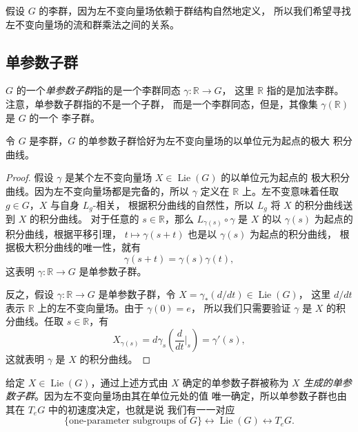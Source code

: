 \documentclass[fontset=none]{Notes}
\DeclareMathOperator\Lie{Lie}
\begin{document}
假设 $G$ 的李群，因为左不变向量场依赖于群结构自然地定义，
所以我们希望寻找左不变向量场的流和群乘法之间的关系。

\subsection{单参数子群}

$G$ 的一个\emph{单参数子群}指的是一个李群同态 $\gamma:\mathbb{R}\to G$，
这里 $\mathbb{R}$ 指的是加法李群。注意，单参数子群指的不是一个子群，
而是一个李群同态，但是，其像集 $\gamma(\mathbb{R})$ 是 $G$ 的一个
李子群。

\begin{theorem}[单参数子群的特征]
  令 $G$ 是李群，$G$ 的单参数子群恰好为左不变向量场的以单位元为起点的极大
  积分曲线。
\end{theorem}
\begin{proof}
  假设 $\gamma$ 是某个左不变向量场 $X\in\Lie(G)$ 的以单位元为起点的
  极大积分曲线。因为左不变向量场都是完备的，所以 $\gamma$ 
  定义在 $\mathbb{R}$ 上。左不变意味着任取 $g\in G$，$X$ 与自身 $L_g$-相关，
  根据积分曲线的自然性，所以 $L_g$ 将 $X$ 的积分曲线送到 $X$ 的积分曲线。
  对于任意的 $s\in \mathbb{R}$，那么 $L_{\gamma(s)}\circ\gamma$
  是 $X$ 的以 $\gamma(s)$ 为起点的积分曲线，根据平移引理，
  $t\mapsto \gamma(s+t)$ 也是以 $\gamma(s)$ 为起点的积分曲线，
  根据极大积分曲线的唯一性，就有
  \[
    \gamma(s+t)=\gamma(s)\gamma(t),  
  \]
  这表明 $\gamma:\mathbb{R}\to G$ 是单参数子群。

  反之，假设 $\gamma:\mathbb{R}\to G$ 是单参数子群，令 $X=\gamma_*(d/dt)\in\Lie(G)$，
  这里 $d/dt$ 表示 $\mathbb{R}$ 上的左不变向量场。由于 $\gamma(0)=e$，
  所以我们只需要验证 $\gamma$ 是 $X$ 的积分曲线。任取 $s\in \mathbb{R}$，有
  \[
    X_{\gamma(s)}=d \gamma_{s}\left(\frac{d}{dt}\bigg|_s\right)
    =\gamma'(s),
  \]
  这就表明 $\gamma$ 是 $X$ 的积分曲线。
\end{proof}

给定 $X\in\Lie(G)$，通过上述方式由 $X$ 确定的单参数子群被称为
\emph{$X$ 生成的单参数子群}。因为左不变向量场由其在单位元处的值
唯一确定，所以单参数子群也由其在 $T_eG$ 中的初速度决定，也就是说
我们有一一对应
\[
  \{\text{one-parameter subgroups of $G$}\}\longleftrightarrow
  \Lie(G)  \longleftrightarrow T_eG.
\]
\end{document}
